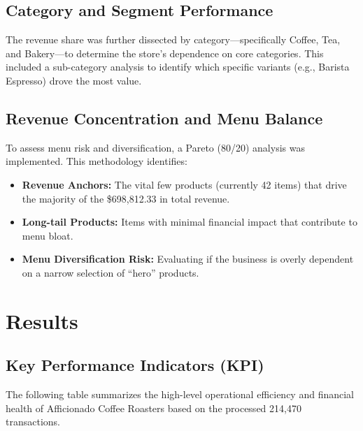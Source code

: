 \documentclass[12pt, a4paper]{article}
\begin{document}
	\subsection{Category and Segment Performance}
	The revenue share was further dissected by category—specifically Coffee, Tea, and Bakery—to determine the store's dependence on core categories. This included a sub-category analysis to identify which specific variants (e.g., Barista Espresso) drove the most value.
	
	\subsection{Revenue Concentration and Menu Balance}
	To assess menu risk and diversification, a Pareto (80/20) analysis was implemented. This methodology identifies:
	\begin{itemize}
		\item \textbf{Revenue Anchors:} The vital few products (currently 42 items) that drive the majority of the \$698,812.33 in total revenue.
		\item \textbf{Long-tail Products:} Items with minimal financial impact that contribute to menu bloat.
		\item \textbf{Menu Diversification Risk:} Evaluating if the business is overly dependent on a narrow selection of ``hero'' products.
	\end{itemize}
	
	\section{Results}
	\subsection{Key Performance Indicators (KPI)}
	The following table summarizes the high-level operational efficiency and financial health of Afficionado Coffee Roasters based on the processed 214,470 transactions.
	
\end{document}

